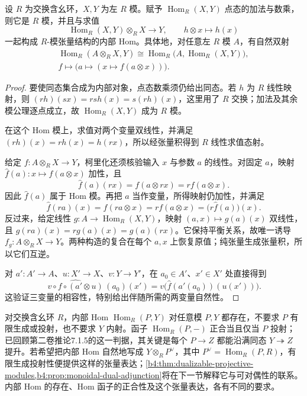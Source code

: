 \begin{theorem}\label{b4:thm:closed-module-hom-tensor}
	设 \(R\) 为交换含幺环，\(X,Y\) 为左 \(R\) 模。赋予 \(\operatorname{Hom}_R(X,Y)\) 点态的加法与数乘，则它是 \(R\) 模，并且与求值
	\[
		\operatorname{Hom}_R(X,Y)\otimes_RX\longrightarrow Y, \qquad h\otimes x\longmapsto h(x)
	\]
	一起构成 \(R\)-模张量结构的内部 Hom。具体地，对任意左 \(R\) 模 \(A\)，有自然双射
	\begin{equation}\label{b4:eq:closed-module-currying}
		\begin{gathered}
			\operatorname{Hom}_R(A\otimes_RX,Y) \cong\operatorname{Hom}_R\bigl(A,\operatorname{Hom}_R(X,Y)\bigr),\\
			f\longmapsto\bigl(a\longmapsto(x\longmapsto f(a\otimes x))\bigr).
		\end{gathered}
	\end{equation}
\end{theorem}
\begin{proof}
	要使同态集合成为内部对象，点态数乘须仍给出同态。若 \(h\) 为 \(R\) 线性映射，则 \((rh)(sx)=rsh(x)=s(rh)(x)\)，这里用了 \(R\) 交换；加法及其余模公理逐点成立，故 \(\operatorname{Hom}_R(X,Y)\) 成为 \(R\) 模。

	在这个 Hom 模上，求值对两个变量双线性，并满足 \((rh)(x)=r h(x)=h(rx)\)，所以经张量积得到 \(R\) 线性求值态射。

	给定 \(f:A\otimes_RX\to Y\)，柯里化还须核验输入 \(x\) 与参数 \(a\) 的线性。对固定 \(a\)，映射 \(\widehat f(a):x\mapsto f(a\otimes x)\) 加性，且
	\[
		\widehat f(a)(rx)=f(a\otimes rx)=r f(a\otimes x).
	\]
	因此 \(\widehat f(a)\) 属于 Hom 模。再把 \(a\) 当作变量，所得映射仍加性，并满足
	\[
		\widehat f(ra)(x)=f(ra\otimes x)=r f(a\otimes x)=\bigl(r\widehat f(a)\bigr)(x).
	\]
	反过来，给定线性 \(g:A\to\operatorname{Hom}_R(X,Y)\)，映射 \((a,x)\mapsto g(a)(x)\) 双线性，且 \(g(ra)(x)=r g(a)(x)=g(a)(rx)\)。它保持平衡关系，故唯一诱导 \(f_g:A\otimes_RX\to Y\)。两种构造的复合在每个 \(a,x\) 上恢复原值；纯张量生成张量积，所以它们互逆。

	对 \(a':A'\to A\)、\(u:X'\to X\)、\(v:Y\to Y'\)，在 \(a_0\in A'\)、\(x'\in X'\) 处直接得到
	\[
		\widehat{\,v\circ f\circ(a'\otimes u)\,}(a_0)(x') =v\bigl(\widehat f(a'(a_0))(u(x'))\bigr).
	\]
	这验证三变量的相容性，特别给出伴随所需的两变量自然性。
\end{proof}

对交换含幺环 \(R\)，内部 Hom \(\operatorname{Hom}_R(P,Y)\) 对任意模 \(P,Y\) 都存在，不要求 \(P\) 有限生成或投射，也不要求 \(Y\) 内射。函子 \(\operatorname{Hom}_R(P,-)\) 正合当且仅当 \(P\) 投射；已回顾第二卷推论7.1.5的这一判据，其关键是每个 \(P\to Z\) 都能沿满同态 \(Y\twoheadrightarrow Z\) 提升。若希望把内部 Hom 自然地写成 \(Y\otimes_RP^\vee\)，其中 \(P^\vee=\operatorname{Hom}_R(P,R)\)，有限生成投射性便提供这样的张量表达；\cref{b4:thm:dualizable-projective-modules,b4:prop:monoidal-dual-adjunction}将在下一节解释它与可对偶性的联系。内部 Hom 的存在、Hom 函子的正合性及这个张量表达，各有不同的要求。

